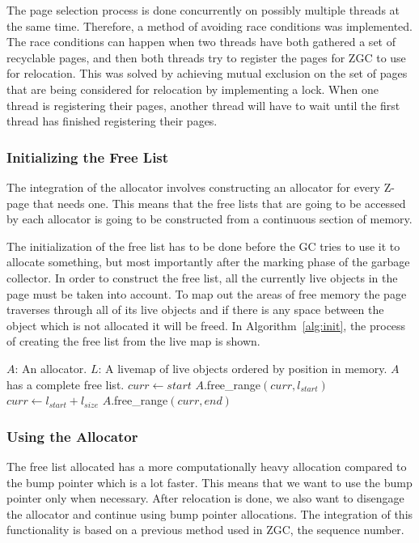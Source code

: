The page selection process is done concurrently on possibly multiple threads at the same time. Therefore, a method of avoiding race conditions was implemented. The race conditions can happen when two threads have both gathered a set of recyclable pages, and then both threads try to register the pages for ZGC to use for relocation. This was solved by achieving mutual exclusion on the set of pages that are being considered for relocation by implementing a lock. When one thread is registering their pages, another thread will have to wait until the first thread has finished registering their pages.

\subsubsection{Initializing the Free List}
The integration of the allocator involves constructing an allocator for every Z-page that needs one. This means that the free lists that are going to be accessed by each allocator is going to be constructed from a continuous section of memory.

The initialization of the free list has to be done before the GC tries to use it to allocate something, but most importantly after the marking phase of the garbage collector. In order to construct the free list, all the currently live objects in the page must be taken into account. To map out the areas of free memory the page traverses through all of its live objects and if there is any space between the object which is not allocated it will be freed. In Algorithm~\ref{alg:init}, the process of creating the free list from the live map is shown.

\begin{algorithm}{}
    \caption{$(A,L)$}
    \label{alg:init}
    \begin{algorithmic}[1]
        \Require 
        \Statex $A$: An allocator.
        \Statex $L$: A livemap of live objects ordered by position in memory. 
        \Ensure 
        \Statex $A$ has a complete free list.
        \State $curr\gets start$ 
        \State $A$.free\_range$(curr, l_{start})$ 
        \EndIf
        \State $curr\gets l_{start} + l_{size}$ 
        \EndFor
        \State $A$.free\_range$(curr,end)$ 
    \end{algorithmic}
\end{algorithm}

\subsubsection{Using the Allocator}
The free list allocated has a more computationally heavy allocation compared to the bump pointer which is a lot faster. This means that we want to use the bump pointer only when necessary. After relocation is done, we also want to disengage the allocator and continue using bump pointer allocations. The integration of this functionality is based on a previous method used in ZGC, the sequence number.
